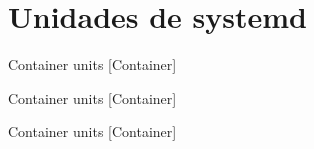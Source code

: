 \section{Unidades de systemd}

\begin{frame}[c]{Container units [Container]}
\end{frame}

\begin{frame}[c]{Container units [Container]}
\end{frame}

\begin{frame}[c]{Container units [Container]}
\end{frame}
